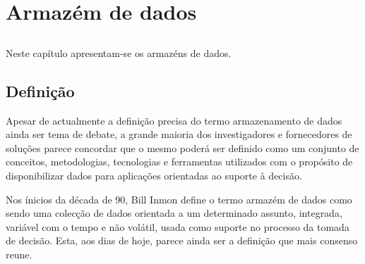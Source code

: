 \chapter{Armazém de dados}
\label{chap:data_warehouse}

\section*{}

Neste capítulo apresentam-se os armazéns de dados.

\section{Definição}
\label{section:definition}

Apesar de actualmente a definição precisa do termo armazenamento de dados ainda
ser tema de debate, a grande maioria dos investigadores e fornecedores de soluções
parece concordar que o mesmo poderá ser definido como um conjunto de conceitos,
metodologias, tecnologias e ferramentas utilizados com o propósito de disponibilizar
dados para aplicações orientadas ao suporte à decisão.


Nos ínicios da década de 90, Bill Inmon \citet{Inmon92} define o termo armazém
de dados como sendo uma colecção de dados orientada a um determinado assunto,
integrada, variável com o tempo e não volátil, usada como suporte no processo
da tomada de decisão. Esta, aos dias de hoje, parece ainda ser a definição que
mais consenso reune.

